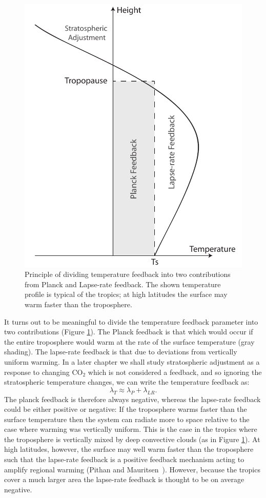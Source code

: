 \documentclass[12pt]{book}
\begin{document}
\begin{figure}
\begin{center}
\includegraphics[width=8 cm]{../illustrations/Planck_LR_feedback.pdf}
\end{center}
\caption{ Principle of dividing temperature feedback into two contributions from Planck and Lapse-rate feedback. The shown temperature profile is typical of the tropics; at high latitudes the surface may warm faster than the troposphere. } 
\label{fig:planck_LR}
\end{figure}

It turns out to be meaningful to divide the temperature feedback parameter into two contributions (Figure \ref{fig:planck_LR}). The Planck feedback is that which would occur if the entire troposphere would warm at the rate of the surface temperature (gray shading). The lapse-rate feedback is that due to deviations from vertically uniform warming. In a later chapter we shall study stratospheric adjustment as a response to changing CO$_2$ which is not considered a feedback, and so ignoring the stratospheric temperature changes, we can write the temperature feedback as:
\begin{equation}
\lambda_T \approx \lambda_P + \lambda_{LR}.
\end{equation}
The planck feedback is therefore always negative, whereas the lapse-rate feedback could be either positive or negative: If the troposphere warms faster than the surface temperature then the system can radiate more to space relative to the case where warming was vertically uniform. This is the case in the tropics where the troposphere is vertically mixed by deep convective clouds (as in Figure \ref{fig:planck_LR}). At high latitudes, however, the surface may well warm faster than the troposphere such that the lapse-rate feedback is a positive feedback mechanism acting to amplify regional warming (Pithan and Mauritsen \cite{Pithan2014}). However, because the tropics cover a much larger area the lapse-rate feedback is thought to be on average negative.
\end{document}
